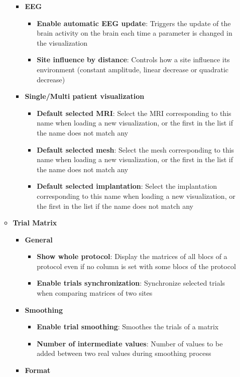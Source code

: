 \documentclass[a4paper]{article}
\begin{document}
\begin{itemize}
\begin{itemize}
\begin{itemize}
\item \textbf{EEG}
\begin{itemize}
\item \textbf{Enable automatic EEG update}: Triggers the update of the brain activity on the brain each time a parameter is changed in the visualization
\item \textbf{Site influence by distance}: Controls how a site influence its environment (constant amplitude, linear decrease or quadratic decrease)
\end{itemize}
\item \textbf{Single/Multi patient visualization}
\begin{itemize}
\item \textbf{Default selected MRI}: Select the MRI corresponding to this name when loading a new visualization, or the first in the list if the name does not match any
\item \textbf{Default selected mesh}: Select the mesh corresponding to this name when loading a new visualization, or the first in the list if the name does not match any
\item \textbf{Default selected implantation}: Select the implantation corresponding to this name when loading a new visualization, or the first in the list if the name does not match any
\end{itemize}
\end{itemize}
\item \textbf{Trial Matrix}
\begin{itemize}
\item \textbf{General}
\begin{itemize}
\item \textbf{Show whole protocol}: Display the matrices of all blocs of a protocol even if no column is set with some blocs of the protocol
\item \textbf{Enable trials synchronization}: Synchronize selected trials when comparing matrices of two sites
\end{itemize}
\item \textbf{Smoothing}
\begin{itemize}
\item \textbf{Enable trial smoothing}: Smoothes the trials of a matrix
\item \textbf{Number of intermediate values}: Number of values to be added between two real values during smoothing process
\end{itemize}
\item \textbf{Format}
\begin{itemize}

\end{itemize}
\end{itemize}
\end{itemize}
\end{itemize}
\end{document}
